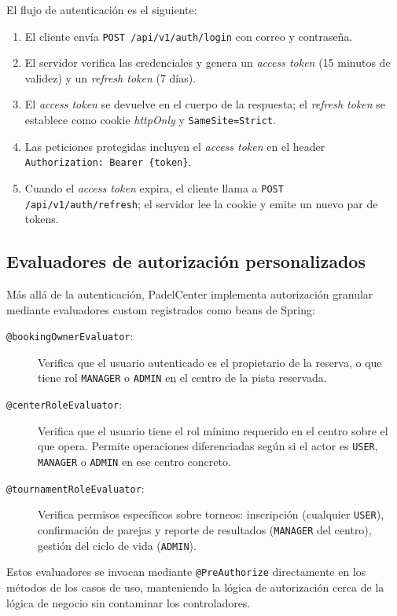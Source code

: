 El flujo de autenticación es el siguiente:
\begin{enumerate}
  \item El cliente envía \texttt{POST /api/v1/auth/login} con correo y contraseña.
  \item El servidor verifica las credenciales y genera un \textit{access token}
    (15 minutos de validez) y un \textit{refresh token} (7 días).
  \item El \textit{access token} se devuelve en el cuerpo de la respuesta; el
    \textit{refresh token} se establece como cookie \textit{httpOnly} y
    \texttt{SameSite=Strict}.
  \item Las peticiones protegidas incluyen el \textit{access token} en el
    header \texttt{Authorization: Bearer \{token\}}.
  \item Cuando el \textit{access token} expira, el cliente llama a
    \texttt{POST /api/v1/auth/refresh}; el servidor lee la cookie y emite un
    nuevo par de tokens.
\end{enumerate}

\subsection{Evaluadores de autorización personalizados}

Más allá de la autenticación, PadelCenter implementa autorización granular
mediante evaluadores custom registrados como beans de Spring:

\begin{description}
  \item[\texttt{@bookingOwnerEvaluator}:] Verifica que el usuario autenticado
    es el propietario de la reserva, o que tiene rol \texttt{MANAGER} o
    \texttt{ADMIN} en el centro de la pista reservada.

  \item[\texttt{@centerRoleEvaluator}:] Verifica que el usuario tiene el rol
    mínimo requerido en el centro sobre el que opera. Permite operaciones
    diferenciadas según si el actor es \texttt{USER}, \texttt{MANAGER} o
    \texttt{ADMIN} en ese centro concreto.

  \item[\texttt{@tournamentRoleEvaluator}:] Verifica permisos específicos
    sobre torneos: inscripción (cualquier \texttt{USER}), confirmación de parejas
    y reporte de resultados (\texttt{MANAGER} del centro), gestión del ciclo
    de vida (\texttt{ADMIN}).
\end{description}

Estos evaluadores se invocan mediante \texttt{@PreAuthorize} directamente en
los métodos de los casos de uso, manteniendo la lógica de autorización cerca
de la lógica de negocio sin contaminar los controladores.
